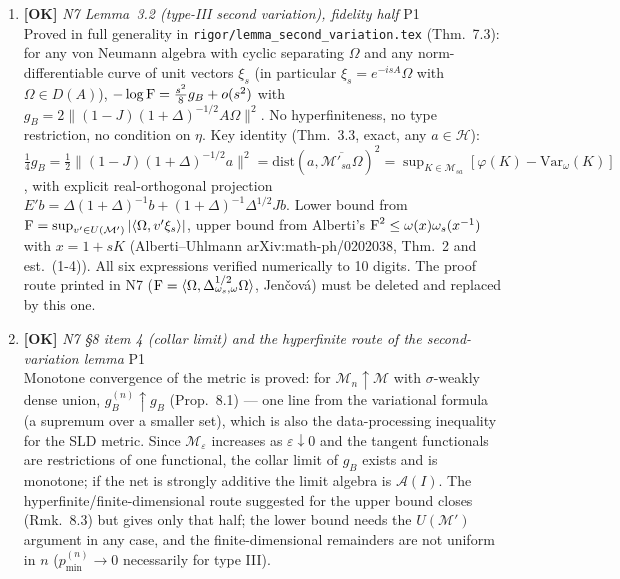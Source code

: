 \documentclass[11pt]{article}
\begin{document}
\begin{enumerate}[leftmargin=1.6em,itemsep=6pt]
\item \textbf{[OK]} \emph{N7 Lemma~3.2 (type-III second variation), fidelity half} \hfill\textsc{P1}\\ Proved in full generality in \texttt{rigor/lemma\_second\_variation.tex} (Thm.~7.3): for any von Neumann algebra with cyclic separating \(\Omega\) and any norm-differentiable curve of unit vectors \(\xi_s\) (in particular \(\xi_s=e^{-isA}\Omega\) with \(\Omega\in D(A)\)), \(-\log\operatorname{F}=\frac{s^2}{8}g_B+o(s^2)\) with \(g_B=2\|(1-J)(1+\Delta)^{-1/2}A\Omega\|^2\). No hyperfiniteness, no type restriction, no condition on \(\eta\). Key identity (Thm.~3.3, exact, any \(a\in\mathcal H\)): \(\frac14 g_B=\frac12\|(1-J)(1+\Delta)^{-1/2}a\|^2=\mathrm{dist}(a,\overline{\mathcal M'_{sa}\Omega})^2=\sup_{K\in\mathcal M_{sa}}[\varphi(K)-\mathrm{Var}_\omega(K)]\), with explicit real-orthogonal projection \(E'b=\Delta(1+\Delta)^{-1}b+(1+\Delta)^{-1}\Delta^{1/2}Jb\). Lower bound from \(\operatorname{F}=\sup_{v'\in U(\mathcal M')}|\langle\Omega,v'\xi_s\rangle|\), upper bound from Alberti's \(\operatorname{F}^2\le\omega(x)\omega_s(x^{-1})\) with \(x=1+sK\) (Alberti--Uhlmann arXiv:math-ph/0202038, Thm.~2 and est.~(1-4)). All six expressions verified numerically to 10 digits. The proof route printed in N7 (\(\operatorname{F}=\langle\Omega,\Delta_{\omega_s,\omega}^{1/2}\Omega\rangle\), Jen\v cov\'a) must be deleted and replaced by this one.
\item \textbf{[OK]} \emph{N7 \S8 item 4 (collar limit) and the hyperfinite route of the second-variation lemma} \hfill\textsc{P1}\\ Monotone convergence of the metric is proved: for \(\mathcal M_n\uparrow\mathcal M\) with \(\sigma\)-weakly dense union, \(g_B^{(n)}\uparrow g_B\) (Prop.~8.1) --- one line from the variational formula (a supremum over a smaller set), which is also the data-processing inequality for the SLD metric. Since \(\mathcal M_\varepsilon\) increases as \(\varepsilon\downarrow0\) and the tangent functionals are restrictions of one functional, the collar limit of \(g_B\) exists and is monotone; if the net is strongly additive the limit algebra is \(\mathcal A(I)\). The hyperfinite/finite-dimensional route suggested for the upper bound closes (Rmk.~8.3) but gives only that half; the lower bound needs the \(U(\mathcal M')\) argument in any case, and the finite-dimensional remainders are not uniform in \(n\) (\(p^{(n)}_{\min}\to0\) necessarily for type III).

\end{enumerate}
\end{document}
